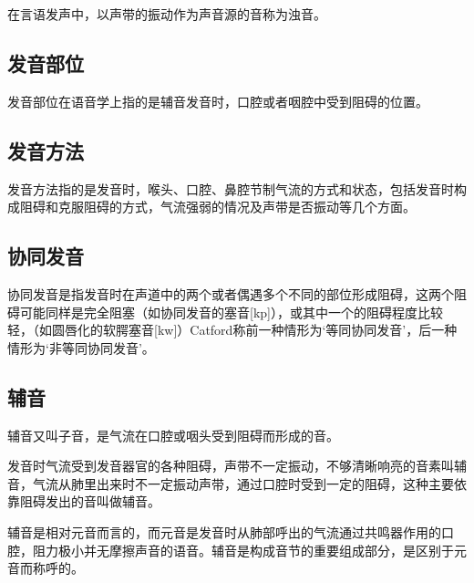 在言语发声中，以声带的振动作为声音源的音称为浊音。

\subsection{发音部位}

发音部位在语音学上指的是辅音发音时，口腔或者咽腔中受到阻碍的位置。

\subsection{发音方法}

发音方法指的是发音时，喉头、口腔、鼻腔节制气流的方式和状态，包括发音时构成阻碍和克服阻碍的方式，气流强弱的情况及声带是否振动等几个方面。

\subsection{协同发音}
协同发音是指发音时在声道中的两个或者偶遇多个不同的部位形成阻碍，这两个阻碍可能同样是完全阻塞（如协同发音的塞音[kp]），或其中一个的阻碍程度比较轻，（如圆唇化的软腭塞音[kw]）Catford称前一种情形为‘等同协同发音’，后一种情形为‘非等同协同发音’。

\subsection{辅音}

辅音又叫子音，是气流在口腔或咽头受到阻碍而形成的音。


发音时气流受到发音器官的各种阻碍，声带不一定振动，不够清晰响亮的音素叫辅音，气流从肺里出来时不一定振动声带，通过口腔时受到一定的阻碍，这种主要依靠阻碍发出的音叫做辅音。


辅音是相对元音而言的，而元音是发音时从肺部呼出的气流通过共鸣器作用的口腔，阻力极小并无摩擦声音的语音。辅音是构成音节的重要组成部分，是区别于元音而称呼的。

